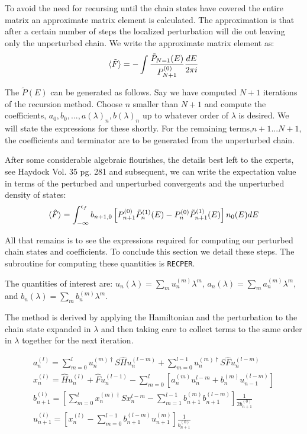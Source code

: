 To avoid the need for recursing until the chain states have covered the entire matrix
an approximate matrix element is calculated. The approximation is that after a certain number
of steps the localized perturbation will die out leaving only the unperturbed chain. We
write the approximate matrix element as:
%
\begin{equation}
\langle \tilde{F} \rangle = -\int \frac{\tilde{P}_{N=1}(E)}{P_{N+1}^{(0)}} \frac{dE}{2\pi i}
\end{equation}
%

The $\tilde{P}(E)$ can be generated as follows. Say we have computed $N+1$ iterations of the recursion method.
Choose $n$ smaller than $N+1$ and compute the coefficients, $a_{0},b_{0},...,a(\lambda)_{n},b(\lambda)_{n}$
up to whatever order of $\lambda$ is desired. We will state
the expressions for these shortly. For the remaining terms,$n+1...N+1$, 
the coefficients and terminator are to be generated from the unperturbed chain.

After some considerable algebraic flourishes, the details best left to the experts, see Haydock Vol. 35 pg. 281 and 
subsequent, we can write the expectation value in terms of the perturbed and unperturbed convergents and the unperturbed
density of states:
%
\begin{equation}
\langle \hat{F} \rangle = \int_{-\infty}^{\epsilon_{f}}b_{n+1,0}\left[P_{n+1}^{(0)}\tilde{P}_{n}^{(1)}(E) - P_{n}^{(0)}\tilde{P}_{n+1}^{(1)}(E) \right]n_{0}(E)dE
\end{equation}
%

All that remains is to see the expressions required for computing our perturbed chain states and coefficients.
To conclude this section we detail these steps.
The subroutine for computing these quantities is \texttt{RECPER}.

The quantities of interest are: 
$u_{n}(\lambda)=\sum_{m}u_{n}^{(m)}\lambda^{m}$, 
$a_{n}(\lambda)=\sum_{m}a_{n}^{(m)}\lambda^{m}$, and 
$b_{n}(\lambda)=\sum_{m}b_{n}^{(m)}\lambda^{m}$. 

The method is derived by applying the Hamiltonian and the perturbation to the chain state expanded in $\lambda$
and then taking care to collect terms to the same order in $\lambda$ together for the next iteration.

\begin{align}
        a_{n}^{(l)} = \sum_{m=0}^{l} u_{n}^{(m)\dagger } S\hat{H} u_{n}^{(l-m)} + \sum_{m=0}^{l-1} u_{n}^{(m)\dagger}S\hat{F} u_{n}^{(l-m)} \\
        x_{n}^{(l)} = \hat{H} u_{n}^{(l)} + \hat{F} u_{n}^{(l-1)} - \sum_{m=0}^{l}\left[ a_{n}^{(m)}u_{n}^{l-m} + b_{n}^{(m)}u_{n-1}^{(l-m)} \right] \\
        b_{n+1}^{(l)} = \left[ \sum_{m=0}^{l} x^{(m)\dagger }_{n}S x^{l-m}_{n} - \sum_{m=1}^{l-1} b_{n+1}^{(m)} b_{n+1}^{(l-m)} \right]\frac{1}{2b_{n+1}^{(0)}} \\
        u_{n+1}^{(l)} = \left[ x_{n}^{(l)} - \sum_{m=0}^{l-1} b^{(l-m)}_{n+1} u^{(m)}_{n+1} \right] \frac{1}{b_{n+1}^{(0)}} 
\end{align}

